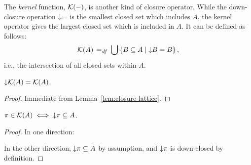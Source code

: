 \documentclass[11pt]{report}
\begin{document}
The \emph{kernel} function, $\mathcal{K}(-)$, is another kind of closure operator. While the down-closure operation $\operatorname{\downarrow}\!-$ is the smallest closed set which includes $A$, the kernel operator gives the largest closed set which is included in $A$. It can be defined as follows: \begin{equation}
	\mathcal{K}(A) \operatorname{\;=_{\mathit{df}}\;} \bigcup \left\lbrace B \subseteq A \mid \operatorname{\downarrow}\!B = B \right\rbrace,
\end{equation} i.e., the intersection of all closed sets within $A$. 

\begin{lemma}
	\label{lem:kernel-closure}
	$\operatorname{\downarrow}\!\mathcal{K}(A) = \mathcal{K}(A)$. 	
\end{lemma}

\begin{proof}
	Immediate from Lemma~\ref{lem:closure-lattice}. 
\end{proof}

\begin{lemma}
	\label{lem:kernel-downset}
	$\pi \in \mathcal{K}(A) \iff \operatorname{\downarrow}\!\pi \subseteq A$. 
\end{lemma}

\begin{proof}
	In one direction: 
	
	In the other direction, $\operatorname{\downarrow}\!\pi \subseteq A$ by assumption, and $\operatorname{\downarrow}\!\pi$ is down-closed by definition. 
	
\end{proof}
\end{document}
